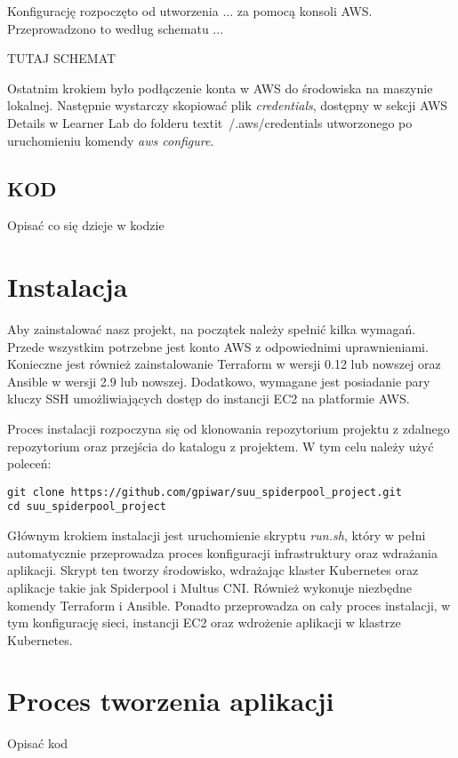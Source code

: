 \documentclass[onecolumn,12pt]{article}
\begin{document}
Konfigurację rozpoczęto od utworzenia  ...  za pomocą konsoli AWS. 
Przeprowadzono to według schematu ... 

 
TUTAJ SCHEMAT 



Ostatnim krokiem było podłączenie konta w AWS do środowiska na maszynie lokalnej. Następnie wystarczy skopiować plik \textit{credentials}, dostępny w  sekcji AWS Details w Learner Lab do folderu textit{~/.aws/credentials} utworzonego po uruchomieniu komendy \textit{aws configure}.

\subsection{KOD}

Opisać co się dzieje w kodzie 


\section{Instalacja}

Aby zainstalować nasz projekt, na początek należy spełnić kilka wymagań. Przede wszystkim 
potrzebne jest konto AWS z odpowiednimi uprawnieniami. Konieczne jest również zainstalowanie
Terraform w wersji 0.12 lub nowszej oraz Ansible w wersji 2.9 lub nowszej. Dodatkowo, wymagane
jest posiadanie pary kluczy SSH umożliwiających dostęp do instancji EC2 na platformie AWS.

Proces instalacji rozpoczyna się od klonowania repozytorium projektu z zdalnego repozytorium 
oraz przejścia do katalogu z projektem. W tym celu należy użyć poleceń:

\begin{verbatim}
git clone https://github.com/gpiwar/suu_spiderpool_project.git
cd suu_spiderpool_project
\end{verbatim}

Głównym krokiem instalacji jest uruchomienie skryptu \textit{run.sh}, który w pełni automatycznie przeprowadza proces konfiguracji infrastruktury oraz wdrażania aplikacji. Skrypt ten tworzy środowisko, wdrażając klaster Kubernetes oraz aplikacje takie jak Spiderpool i Multus CNI. Również wykonuje niezbędne komendy Terraform i Ansible. Ponadto przeprowadza on cały proces instalacji, w tym konfigurację sieci, instancji EC2 oraz wdrożenie aplikacji w klastrze Kubernetes.

\section{Proces tworzenia aplikacji}
Opisać kod 
\end{document}

